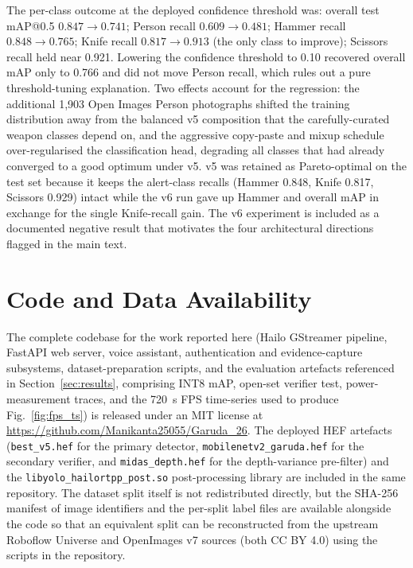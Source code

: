 \documentclass{ieeeaccess}
\begin{document}
The per-class outcome at the deployed confidence threshold was: overall test mAP{@}0.5 $0.847 \to 0.741$; Person recall $0.609 \to 0.481$; Hammer recall $0.848 \to 0.765$; Knife recall $0.817 \to 0.913$ (the only class to improve); Scissors recall held near 0.921. Lowering the confidence threshold to 0.10 recovered overall mAP only to 0.766 and did not move Person recall, which rules out a pure threshold-tuning explanation. Two effects account for the regression: the additional 1{,}903 Open Images Person photographs shifted the training distribution away from the balanced v5 composition that the carefully-curated weapon classes depend on, and the aggressive copy-paste and mixup schedule over-regularised the classification head, degrading all classes that had already converged to a good optimum under v5. v5 was retained as Pareto-optimal on the test set because it keeps the alert-class recalls (Hammer 0.848, Knife 0.817, Scissors 0.929) intact while the v6 run gave up Hammer and overall mAP in exchange for the single Knife-recall gain. The v6 experiment is included as a documented negative result that motivates the four architectural directions flagged in the main text.




\section*{Code and Data Availability}
\label{sec:code_data}
The complete codebase for the work reported here (Hailo GStreamer pipeline, FastAPI web server, voice assistant, authentication and evidence-capture subsystems, dataset-preparation scripts, and the evaluation artefacts referenced in Section~\ref{sec:results}, comprising INT8 mAP, open-set verifier test, power-measurement traces, and the 720~s FPS time-series used to produce Fig.~\ref{fig:fps_ts}) is released under an MIT license at \url{https://github.com/Manikanta25055/Garuda_26}. The deployed HEF artefacts (\texttt{best\_v5.hef} for the primary detector, \texttt{mobilenetv2\_garuda.hef} for the secondary verifier, and \texttt{midas\_depth.hef} for the depth-variance pre-filter) and the \texttt{libyolo\_hailortpp\_post.so} post-processing library are included in the same repository. The dataset split itself is not redistributed directly, but the SHA-256 manifest of image identifiers and the per-split label files are available alongside the code so that an equivalent split can be reconstructed from the upstream Roboflow Universe and OpenImages v7 sources (both CC BY 4.0) using the scripts in the repository.
\end{document}
